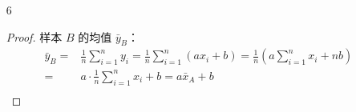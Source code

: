 \documentclass[normal,founder,mtpro2,cn]{elegantnote}
\begin{document}
\begin{enumerate}
\begin{proof}
            （另一种思路）
            \begin{equation*}
                \begin{aligned}
                    s_{n+1}^{2}=&\frac{1}{n}\sum_{i=1}^{n+1}\left(x_{i}-\bar{x}_{n+1}\right)^{2}=\frac{1}{n}\sum_{i=1}^{n+1}\left[(x_{i}-\bar{x}_n)+(\bar{x}_n-\bar{x}_{n+1})\right]^{2} \\
                    =&\frac{1}{n}\left[\sum_{i=1}^{n+1}\left(x_{i}-\bar{x}_{n}\right)^{2}\right]+\frac{2}{n}\left(\bar{x}_{n}-\bar{x}_{n+1}\right)\sum_{i=1}^{n+1}\left(x_{i}-\bar{x}_{n}\right)+\frac{1}{n}\left(\bar{x}_{n}-\bar{x}_{n+1}\right)^{2} \\
                    =&\frac{1}{n}\left[\sum_{i=1}^{n+1}\left(x_{i}-\bar{x}_{n}\right)^{2}\right]-\frac{1}{n}\left(\bar{x}_{n}-\bar{x}_{n+1}\right)^{2} \\
                    =&\frac{1}{n}\left[\sum_{i=1}^{n+1}\left(x_{i}-\bar{x}_{n}\right)^{2}\right]-\frac{n+1}{n}\left(\bar{x}_{n}-\bar{x}_{n+1}\right)^{2} \\
                    =&\frac{1}{n}\left[\sum_{i=1}^{n}\left(x_{i}-\bar{x}_{n}\right)^{2}+\left(x_{n+1}-\bar{x}_{n}\right)^{2}\right]-\frac{n+1}{n}\frac{1}{(n+1)^{2}}\left(x_{n+1}-\bar{x}_{n}\right)^{2} \\
                    =&\frac{1}{n}\left[(n-1) \frac{1}{n-1} \sum_{i=1}^{n}\left(x_{i}-\bar{x}_{n}\right)^{2}+\frac{n}{n+1}\left(x_{n+1}-\bar{x}_{n}\right)^{2}\right] \\
                    =&\frac{n-1}{n} s_{n}^{2}+\frac{1}{n+1}\left(x_{n+1}-\bar{x}_{n}\right)^{2}
                \end{aligned}
            \end{equation*}
        \end{proof}

        \item[6] 
        \begin{proof}
            样本 $B$ 的均值 $\bar{y}_{B}$：
            \begin{equation*}
                \begin{aligned}
                    \bar{y}_{B}=&\frac{1}{n}\sum_{i=1}^{n}y_{i}=\frac{1}{n}\sum_{i=1}^{n}\left(ax_{i}+b\right)=\frac{1}{n}\left(a\sum_{i=1}^{n}x_{i}+nb\right) \\
                    =&a\cdot\frac{1}{n}\sum_{i=1}^{n}x_{i}+b=a\bar{x}_{A}+b \\
                \end{aligned}
            \end{equation*}
    

\end{proof}
\end{enumerate}
\end{document}
